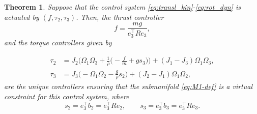 \documentclass[letterpaper, 10 pt, conference]{ieeeconf}
\newtheorem{theorem}{Theorem}
\begin{document}
\begin{theorem}
    Suppose that the control system \eqref{eq:transl_kin}-\eqref{eq:rot_dyn} is actuated by $(f,\tau_2,\tau_3)$. Then, the thrust controller
    $$f=\frac{mg}{e_3^\top R e_3},$$
    and the torque controllers given by
    
\begin{align}
\tau_2 &= J_2\Big(\Omega_1\Omega_3 + \frac{1}{\rho}\Big(-\frac{f}{m}+g s_3\Big)\Big)+(J_1-J_3)\Omega_1\Omega_3,\nonumber\\
\tau_3 &= J_3\Big(-\Omega_1\Omega_2 - \frac{g}{\rho}s_2\Big)+(J_2-J_1)\Omega_1\Omega_2,\label{eq:tau23-laws}
\end{align} are the unique controllers ensuring that the submanifold \eqref{eq:M1-def} is a virtual constraint for this control system, where
    \[
        s_2=e_3^\top b_2=e_3^\top R e_2,\qquad s_3=e_3^\top b_3=e_3^\top R e_3.
    \]
\end{theorem}
\end{document}
